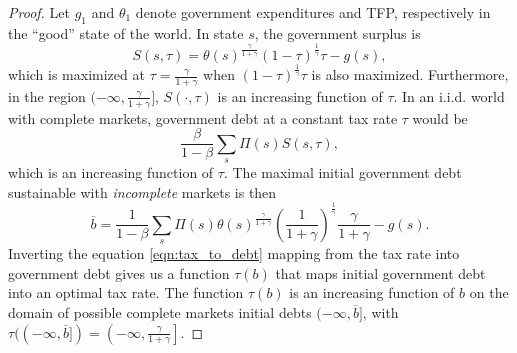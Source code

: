 \documentclass[12pt]{article}
\begin{document}
\begin{proof}  Let $g_1$ and $\theta_1$ denote  government expenditures and TFP, respectively in the ``good'' state of the world.
 In state $s$, the government surplus is
\[
	S(s,\tau) = \theta(s)^\frac\gamma{1+\gamma}(1-\tau)^\frac1\gamma\tau - g(s),
\]  which  is  maximized at $\tau = \frac\gamma{1+\gamma}$ when $(1-\tau)^\frac1\gamma\tau$ is also maximized. Furthermore, in the region $(-\infty,\frac\gamma{1+\gamma}]$, $S(\cdot,\tau)$ is an increasing function of $\tau$.  In an i.i.d. world with complete markets, government debt
at a constant tax rate $\tau$ would be
\begin{equation}\label{eqn:tax_to_debt}
	\frac\beta{1-\beta} \sum_s \Pi(s) S(s,\tau),
\end{equation}which is an increasing function of $\tau$.  The maximal initial government debt sustainable with {\em incomplete} markets is then
\[
	\overline b = \frac1{1-\beta} \sum_s \Pi(s)\theta(s)^\frac\gamma{1+\gamma}\left(\frac{1}{1+\gamma}\right)^\frac1\gamma\frac{\gamma}{1+\gamma} - g(s) .\] Inverting the equation \eqref{eqn:tax_to_debt} mapping   from the tax rate into government debt gives us a function $\tau(b)$ that maps initial government debt into an optimal tax rate. The function $\tau(b)$ is an increasing function of $b$ on the domain of possible complete markets initial debts $(-\infty,\overline b]$, with $\tau((-\infty,\overline{b}]) = \left(-\infty,\frac\gamma{1+\gamma}\right]$.



\end{proof}
\end{document}
